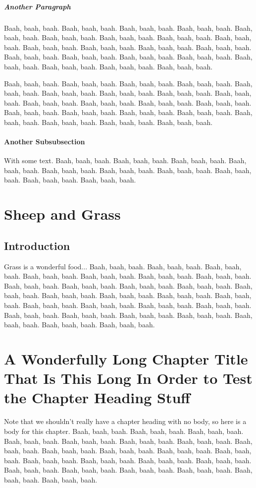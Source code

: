 \documentclass[proposal]{umassthesis}          %
\begin{document}
\paragraph{Another Paragraph}
Baah, baah, baah.  Baah, baah, baah.  Baah, baah, baah.  Baah, baah,
baah.  Baah, baah, baah.  Baah, baah, baah.  Baah, baah, baah.  Baah,
baah, baah.  Baah, baah, baah.  Baah, baah, baah.  Baah, baah, baah.
Baah, baah, baah.  Baah, baah, baah.  Baah, baah, baah.  Baah, baah,
baah.  Baah, baah, baah.  Baah, baah, baah.  Baah, baah, baah.  Baah,
baah, baah.  Baah, baah, baah.  Baah, baah, baah.

Baah, baah, baah.  Baah, baah, baah.  Baah, baah, baah.  Baah, baah,
baah.  Baah, baah, baah.  Baah, baah, baah.  Baah, baah, baah.  Baah,
baah, baah.  Baah, baah, baah.  Baah, baah, baah.  Baah, baah, baah.
Baah, baah, baah.  Baah, baah, baah.  Baah, baah, baah.  Baah, baah,
baah.  Baah, baah, baah.  Baah, baah, baah.  Baah, baah, baah.  Baah,
baah, baah.  Baah, baah, baah.  Baah, baah, baah.
\subsubsection{Another Subsubsection}
With some text.  Baah, baah, baah.  Baah, baah, baah.  Baah, baah,
baah.  Baah, baah, baah.  Baah, baah, baah.  Baah, baah, baah.  Baah,
baah, baah.  Baah, baah, baah.  Baah, baah, baah.  Baah, baah, baah. 

\chapter{Sheep and Grass}

\section{Introduction}

Grass is a wonderful food...  Baah, baah, baah.  Baah, baah, baah.
Baah, baah, baah.  Baah, baah, baah.  Baah, baah, baah.  Baah, baah,
baah.  Baah, baah, baah.  Baah, baah, baah.  Baah, baah, baah.  Baah,
baah, baah.  Baah, baah, baah.  Baah, baah, baah.  Baah, baah, baah.
Baah, baah, baah.  Baah, baah, baah.  Baah, baah, baah.  Baah, baah,
baah.  Baah, baah, baah.  Baah, baah, baah.  Baah, baah, baah.  Baah,
baah, baah.  Baah, baah, baah.  Baah, baah, baah.  Baah, baah, baah.
Baah, baah, baah.  Baah, baah, baah.  Baah, baah, baah. 

\chapter{A Wonderfully Long Chapter Title That Is This Long In Order
  to Test the Chapter Heading Stuff}
Note that we shouldn't really have a chapter heading with no body, so
here is a body for this chapter.  Baah, baah, baah.  Baah, baah, baah.
Baah, baah, baah.  Baah, baah, baah.  Baah, baah, baah.  Baah, baah,
baah.  Baah, baah, baah.  Baah, baah, baah.  Baah, baah, baah.  Baah,
baah, baah.  Baah, baah, baah.  Baah, baah, baah.  Baah, baah, baah.
Baah, baah, baah.  Baah, baah, baah.  Baah, baah, baah.  Baah, baah,
baah.  Baah, baah, baah.  Baah, baah, baah.  Baah, baah, baah.  Baah,
baah, baah.  Baah, baah, baah. 
\end{document}
